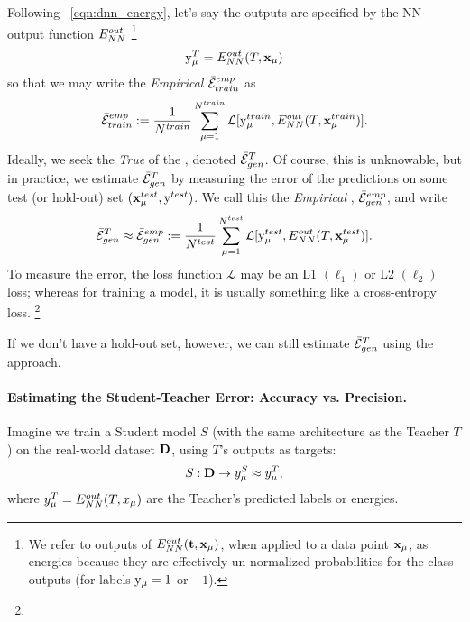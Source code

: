 Following \EQN~\ref{eqn:dnn_energy}, let's say the \Teacher outputs are specified by
the NN output  function $E^{out}_{NN}$
\footnote{
We refer to outputs of $E^{out}_{NN}({\mathbf{t}},\mathbf{x}_{\mu} )$, when applied to a data point $\mathbf{x}_{\mu}$, as energies because they are effectively un-normalized probabilities for the class outputs (for labels $\mathrm{y}_{\mu}=1$ or $-1$).  }
\begin{align}
\label{eqn:T_ENN}
\mathrm{y}_{\mu}^{T}=E^{out}_{NN}(T,\mathbf{x}_{\mu}) 
\end{align}
so that we may write the \emph{Empirical} \AverageTrainingError
$\bar{\mathcal{E}}^{emp}_{train}$
as 
\begin{align}
\label{eqn:Eg_train}
\bar{\mathcal{E}}^{emp}_{train}:= \frac{1}{N^{train}}\sum_{\mu=1}^{N^{train}}\mathcal{L}[\mathrm{y}_{\mu}^{train},E^{out}_{NN}(T,\mathbf{x}_{\mu}^{train})]  .
\end{align}
Ideally, we seek the \emph{True} \AverageGeneralizationError of the \Teacher, denoted  $\bar{\mathcal{E}}_{gen}^{T}$. 
Of course, this is unknowable, but in practice, we estimate $\bar{\mathcal{E}}_{gen}^{T}$ 
by measuring the error of the \Teacher predictions on some test (or hold-out) set $(\mathbf{x}_{\mu}^{test}, \mathrm{y}^{test})$.
We call this the \emph{Empirical \AverageGeneralizationError}, $\bar{\mathcal{E}}^{emp}_{gen}$, and write
\begin{align}
\label{eqn:Eg_test}
 \bar{\mathcal{E}}_{gen}^{T}\approx \bar{\mathcal{E}}^{emp}_{gen}:= \frac{1}{N^{test}}\sum_{\mu=1}^{N^{test}}\mathcal{L}[\mathrm{y}_{\mu}^{test},E^{out}_{NN}(T,\mathbf{x}_{\mu}^{test})] .
\end{align}
To measure the error, the loss function $\mathcal{L}$ may be an L1 $(\ell_1)$ or L2 $(\ell_2)$ loss;
whereas for training a  model, it is usually something like a cross-entropy loss.
\footnote{}

If we don't have a hold-out set, however, we can still estimate $\bar{\mathcal{E}}_{gen}^{T}$ using the \StudentTeacher approach.

\paragraph{Estimating the Student-Teacher Error: Accuracy vs. Precision.}
Imagine we train a Student model $S$ (with the same architecture as the Teacher $T$) on the real-world dataset $\mathbf{D}$, using $T$'s outputs as targets:
\begin{equation*}
S: \mathbf{D} \to y^{S}_\mu \approx y^{T}_\mu,
\label{eqn:S_ENN}
\end{equation*}
where $y^T_\mu = E^{out}_{NN}(T, x_\mu)$ are the Teacher’s predicted labels or energies.

